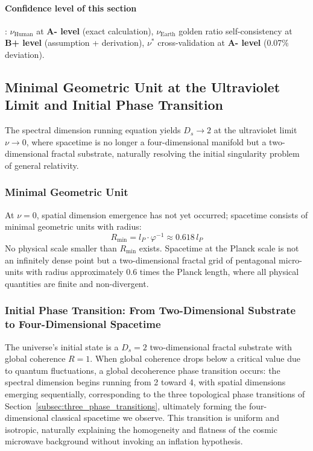 \documentclass[12pt,a4paper,twocolumn]{article}
\renewcommand{\phi}{\varphi}
\begin{document}
\paragraph{Confidence level of this section}: $\nu_{\text{Human}}$ at \textbf{A- level} (exact calculation), $\nu_{\text{Earth}}$ golden ratio self-consistency at \textbf{B+ level} (assumption + derivation), $\nu^*$ cross-validation at \textbf{A- level} (0.07\% deviation).


\subsection{Minimal Geometric Unit at the Ultraviolet Limit and Initial Phase Transition}
\label{subsec:uv_minimal_cell}
The spectral dimension running equation yields $D_s\to2$ at the ultraviolet limit $\nu\to0$, where spacetime is no longer a four-dimensional manifold but a two-dimensional fractal substrate, naturally resolving the initial singularity problem of general relativity.

\subsubsection{Minimal Geometric Unit}
At $\nu=0$, spatial dimension emergence has not yet occurred; spacetime consists of minimal geometric units with radius:
\begin{equation}
R_{\text{min}} = l_P \cdot \phi^{-1} \approx 0.618\, l_P
\end{equation}
No physical scale smaller than $R_{\text{min}}$ exists. Spacetime at the Planck scale is not an infinitely dense point but a two-dimensional fractal grid of pentagonal micro-units with radius approximately 0.6 times the Planck length, where all physical quantities are finite and non-divergent.

\subsubsection{Initial Phase Transition: From Two-Dimensional Substrate to Four-Dimensional Spacetime}
The universe's initial state is a $D_s=2$ two-dimensional fractal substrate with global coherence $R=1$. When global coherence drops below a critical value due to quantum fluctuations, a global decoherence phase transition occurs: the spectral dimension begins running from 2 toward 4, with spatial dimensions emerging sequentially, corresponding to the three topological phase transitions of Section~\ref{subsec:three_phase_transitions}, ultimately forming the four-dimensional classical spacetime we observe. This transition is uniform and isotropic, naturally explaining the homogeneity and flatness of the cosmic microwave background without invoking an inflation hypothesis.
\end{document}
